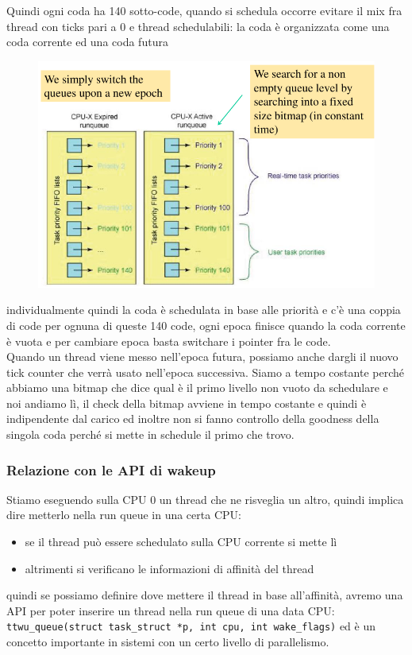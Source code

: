 \documentclass[12pt, oneside]{extbook}
\begin{document}
Quindi ogni coda ha 140 sotto-code, quando si schedula occorre evitare il mix fra thread con ticks pari a 0 e thread schedulabili: la coda è organizzata come una coda corrente ed una coda futura
\begin{figure}[!h]
	\includegraphics[scale=0.3]{immagini/sched_queues.png}
\end{figure}
individualmente quindi la coda è schedulata in base alle priorità e c'è una coppia di code per ognuna di queste 140 code, ogni epoca finisce quando la coda corrente è vuota e per cambiare epoca basta switchare i pointer fra le code.\\Quando un thread viene messo nell'epoca futura, possiamo anche dargli il nuovo tick counter che verrà usato nell'epoca successiva. Siamo a tempo costante perché abbiamo una bitmap che dice qual è il primo livello non vuoto da schedulare e noi andiamo lì, il check della bitmap avviene in tempo costante e quindi è indipendente dal carico ed inoltre non si fanno controllo della goodness della singola coda perché si mette in schedule il primo che trovo.
\subsubsection{Relazione con le API di wakeup}
Stiamo eseguendo sulla CPU 0 un thread che ne risveglia un altro, quindi implica dire metterlo nella run queue in una certa CPU:
\begin{itemize}
\item se il thread può essere schedulato sulla CPU corrente si mette lì
\item altrimenti si verificano le informazioni di affinità del thread
\end{itemize}
quindi se possiamo definire dove mettere il thread in base all'affinità, avremo una API per poter inserire un thread nella run queue di una data CPU: \texttt{ttwu\_queue(struct task\_struct *p, int cpu, int wake\_flags)} ed è un concetto importante in sistemi con un certo livello di parallelismo.
\end{document}
